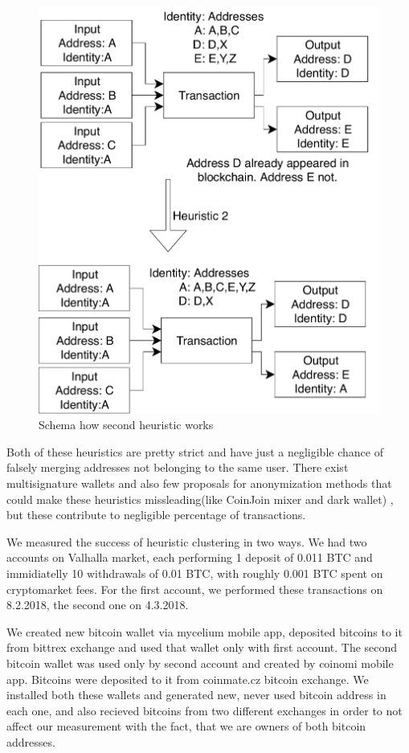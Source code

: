 \documentclass[
  digital, %
  table,   %
  lof,     %
  lot,     %
  oneside
]{fithesis3}
\begin{document}
\begin{figure}[!htb]
    \centering
    \includegraphics[width=1\textwidth]{heur2}
    \caption{Schema how second heuristic works}
    \label{heur2}
\end{figure}

Both of these heuristics are pretty strict and have just a negligible chance of falsely merging
addresses not belonging to the same user\cite{androulaki2013evaluating}.
There exist multisignature wallets and also few proposals for anonymization methods that could make
these heuristics missleading(like CoinJoin mixer and dark wallet) 
, but these contribute to negligible percentage of transactions.

We measured the success of heuristic clustering in two ways.
We had two accounts on Valhalla market, each performing 1 deposit of 0.011 BTC and immidiatelly 10 withdrawals of
0.01 BTC, with roughly 0.001 BTC spent on cryptomarket fees.
For the first account, we performed these transactions on 8.2.2018, the second one on 4.3.2018.

We created new bitcoin wallet via mycelium mobile app, deposited bitcoins to it
from bittrex exchange and used that wallet only with first account.
The second bitcoin wallet was used only by second account and created by coinomi mobile app. 
Bitcoins were deposited to it from coinmate.cz bitcoin exchange.
We installed both these wallets and generated new, never used bitcoin address in each one, and also
recieved bitcoins from two different exchanges in order to not affect
our measurement with the fact, that we are owners of both bitcoin addresses.
\end{document}
